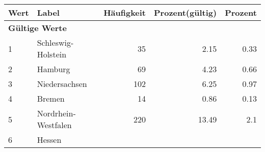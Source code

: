      \begin{longtable}{lXrrr}
     \toprule
     \textbf{Wert} & \textbf{Label} & \textbf{Häufigkeit} & \textbf{Prozent(gültig)} & \textbf{Prozent} \\
     \endhead
     \midrule
     \multicolumn{5}{l}{\textbf{Gültige Werte}}\\

     1 &
     \multicolumn{1}{X}{ Schleswig-Holstein   } &


       \num{35} &
       \num[round-mode=places,round-precision=2]{2.15} &
         \num[round-mode=places,round-precision=2]{0.33} \\

     2 &
     \multicolumn{1}{X}{ Hamburg   } &


       \num{69} &
       \num[round-mode=places,round-precision=2]{4.23} &
         \num[round-mode=places,round-precision=2]{0.66} \\

     3 &
     \multicolumn{1}{X}{ Niedersachsen   } &


       \num{102} &
       \num[round-mode=places,round-precision=2]{6.25} &
         \num[round-mode=places,round-precision=2]{0.97} \\

     4 &
     \multicolumn{1}{X}{ Bremen   } &


       \num{14} &
       \num[round-mode=places,round-precision=2]{0.86} &
         \num[round-mode=places,round-precision=2]{0.13} \\

     5 &
     \multicolumn{1}{X}{ Nordrhein-Westfalen   } &


       \num{220} &
       \num[round-mode=places,round-precision=2]{13.49} &
         \num[round-mode=places,round-precision=2]{2.1} \\

     6 &
     \multicolumn{1}{X}{ Hessen   } &



\end{longtable}
